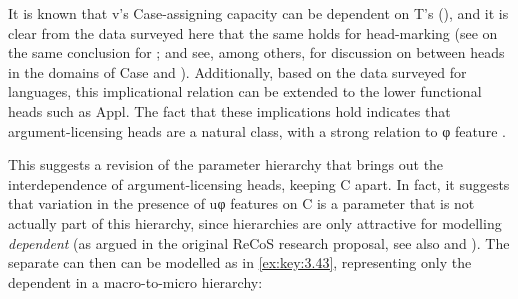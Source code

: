 \documentclass[output=paper]{langsci/langscibook}
\begin{document}
It is known that v’s Case-assigning capacity can be dependent on T’s
(\citealt{Marantz1991,Baker2015}), and it is clear from the data surveyed here
that the same holds for head-marking  (see \citealt{Roberts2014} on
the same conclusion for ; and see, among others,
\citealt{Bobaljik2008,Barany2015} for discussion on 
between heads in the domains of Case and
).
Additionally, based on the data surveyed for  languages, this
implicational relation can be extended to the lower
functional heads such as Appl. The fact that these implications hold indicates
that argument-licensing heads are a natural class, with a strong relation to φ
feature .

This suggests a revision of the parameter hierarchy that brings out the
interdependence of argument-licensing heads, keeping C apart. In fact, it
suggests that variation in the presence of uφ features on C is a parameter that
is not actually part of this hierarchy, since hierarchies are only attractive
for modelling \emph{dependent}  (as argued in the original ReCoS
research proposal, see also \citealt{RobHol2010} and \citealt{Sheehan2014}).
The separate  can then can be modelled as in \eqref{ex:key:3.43},
representing only the dependent  in a macro-to-micro
hierarchy:\newpage
\end{document}
